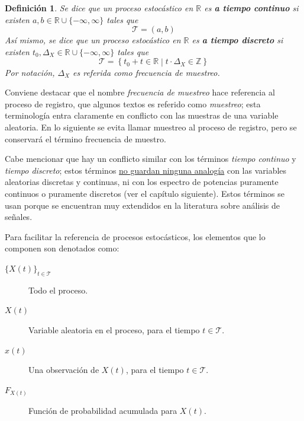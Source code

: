 \documentclass[12pt,letterpaper]{book}
\newtheorem{definicion}{Definición}[chapter]
\newcommand{\R}{\mathbb{R}}
\newcommand{\Z}{\mathbb{Z}}
\newcommand{\xt}{$\{X(t)\}_{t\in \mathcal{T}}$ }
\newcommand{\talque}{\mathrel{}\middle|\mathrel{}}
\begin{document}
\begin{definicion}
Se dice que un proceso estocástico en $\R$ es \textbf{a tiempo continuo} si existen $a, b \in \R \cup \{ -\infty, \infty \}$ tales que
\begin{equation}
\mathcal{T} = (a,b)
\end{equation}
Así mismo, se dice que un proceso estocástico en $\R$ es \textbf{a tiempo discreto} si existen $t_0, \Delta_X \in \R \cup \{ -\infty, \infty \}$ tales que
\begin{equation}
\mathcal{T} = \left\{ t_0 + t \in \R \talque {t} \cdot {\Delta_X} \in \Z \right\}
\end{equation}
Por notación, $\Delta_X$ es referida como \textit{frecuencia de muestreo}.
\end{definicion}

Conviene destacar que el nombre \textit{frecuencia de muestreo} hace referencia al proceso de registro, que algunos textos es referido como \textit{muestreo}; esta terminología entra claramente en conflicto con las muestras de una variable aleatoria. En lo siguiente se evita llamar muestreo al proceso de registro, pero se conservará el término frecuencia de muestro.

Cabe mencionar que hay un conflicto similar con los términos \textit{tiempo continuo} y \textit{tiempo discreto}; estos términos \underline{no guardan ninguna analogía} con las variables aleatorias discretas y continuas, ni con los espectro de potencias puramente continuos o puramente discretos (ver el capítulo siguiente).
%
Estos términos se usan porque se encuentran muy extendidos en la literatura sobre análisis de señales.

Para facilitar la referencia de procesos estocásticos, los elementos que lo componen son denotados como:
\begin{description}
\item[\xt]        Todo el proceso.
\item[$X(t)$]     Variable aleatoria en el proceso, para el tiempo $t \in \mathcal{T}$.
\item[$x(t)$]     Una observación de $X(t)$, para el tiempo $t \in \mathcal{T}$.
\item[$F_{X(t)}$] Función de probabilidad acumulada para $X(t)$.
\end{description}
\end{document}
